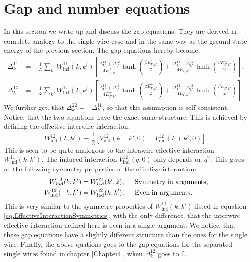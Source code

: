 \section{Gap and number equations}
\label{sec.2wiresgapandnumberequations}
In this section we write up and discuss the gap equations. They are derived in complete analogy to the single wire case and in the same way as the ground state energy of the previous section. The gap equations hereby become:
\begin{align}
\Delta^{11}_k &= -\frac{1}{\mathcal{L}}\sum_{k'} W_{\text{ind}}^{11}(k, k')\left[\frac{\Delta^{11}_{k'} + \Delta^{12}_{k'}}{4E^{+}_{F,k'}}\tanh\left(\frac{\beta E^{+}_{F,k'}}{2}\right) + \frac{\Delta^{11}_{k'} - \Delta^{12}_{k'}}{4E^{-}_{F,k'}}\tanh\left(\frac{\beta E^{-}_{F,k'}}{2}\right)\right], \nonumber \\
\Delta^{12}_k &= -\frac{1}{\mathcal{L}}\sum_{k'} W_{\text{ind}}^{12}(k, k')\left[\frac{\Delta^{12}_{k'} + \Delta^{11}_{k'}}{4E^{+}_{F,k'}}\tanh\left(\frac{\beta E^{+}_{F,k'}}{2}\right) + \frac{\Delta^{12}_{k'} - \Delta^{11}_{k'}}{4E^{-}_{F,k'}}\tanh\left(\frac{\beta E^{-}_{F,k'}}{2}\right)\right].
\label{eq.2wiresgapequations}
\end{align}
We further get, that $\Delta^{22}_k = - \Delta^{11}_k$, so that this assumption is self-consistent. Notice, that the two equations have the exact same structure. This is achieved by defining the effective interwire interaction: 
\begin{equation}
W_{\text{ind}}^{12}(k, k') = \frac{1}{2}\left[V_{\text{ind}}^{12}(k - k', 0) + V_{\text{ind}}^{12}(k + k', 0) \right].
\end{equation}
This is seen to be quite analogous to the intrawire effective interaction $W_{\text{ind}}^{11}(k, k')$. The induced interaction $V_{\text{ind}}^{12}(q, 0)$ only depends on $q^2$. This gives us the following symmetry properties of the effective interaction:
\begin{align}
W_{\text{ind}}^{12}(k,k')   &= W_{\text{ind}}^{12}(k',k), \hspace{0.5cm} \text{Symmetry in arguments}, \nonumber \\
W_{\text{ind}}^{12}(-k,k')  &= W_{\text{ind}}^{12}(k,k'), \hspace{0.5cm} \text{Even in arguments}.
\label{eq.EffectiveInterwireInteractionSymmetries}
\end{align}
This is very similar to the symmetry properties of $W_{\text{ind}}^{11}(k, k')$ listed in equation \ref{eq.EffectiveInteractionSymmetries}, with the only difference, that the interwire effective interaction defined here is even in a single argument. We notice, that these gap equations have a slightly different structure than the ones for the single wire. Finally, the above quations goes to the gap equations for the separated single wires found in chapter \ref{Chapter4}, when $\Delta^{12}_k$ goes to $0$.  	

